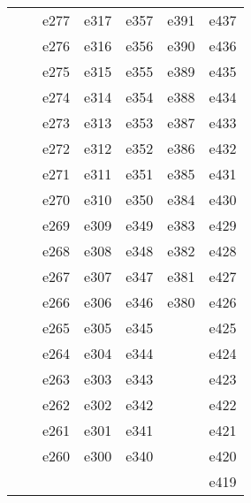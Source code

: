 \documentclass[10pt,letterpaper]{article}
\begin{document}
\begin{center}
\begin{tabular}{ |c|c|c|c|c|c|c| }
        &         & e277 & e317 & e357 & e391 & e437 \\
        &         & e276 & e316 & e356 & e390 & e436 \\
        &         & e275 & e315 & e355 & e389 & e435 \\
        &         & e274 & e314 & e354 & e388 & e434 \\
        &         & e273 & e313 & e353 & e387 & e433 \\
        &         & e272 & e312 & e352 & e386 & e432 \\
        &         & e271 & e311 & e351 & e385 & e431 \\
        &         & e270 & e310 & e350 & e384 & e430 \\
        &         & e269 & e309 & e349 & e383 & e429 \\
        &         & e268 & e308 & e348 & e382 & e428 \\
        &         & e267 & e307 & e347 & e381 & e427 \\
        &         & e266 & e306 & e346 & e380 & e426 \\
        &         & e265 & e305 & e345 &      & e425 \\
        &         & e264 & e304 & e344 &      & e424 \\
        &         & e263 & e303 & e343 &      & e423 \\
        &         & e262 & e302 & e342 &      & e422 \\
        &         & e261 & e301 & e341 &      & e421 \\
        &         & e260 & e300 & e340 &      & e420 \\
        &		  &      &      &      &      & e419  \\

        \hline
        \end{tabular}
        \end{center}

    \clearpage
\end{document}
